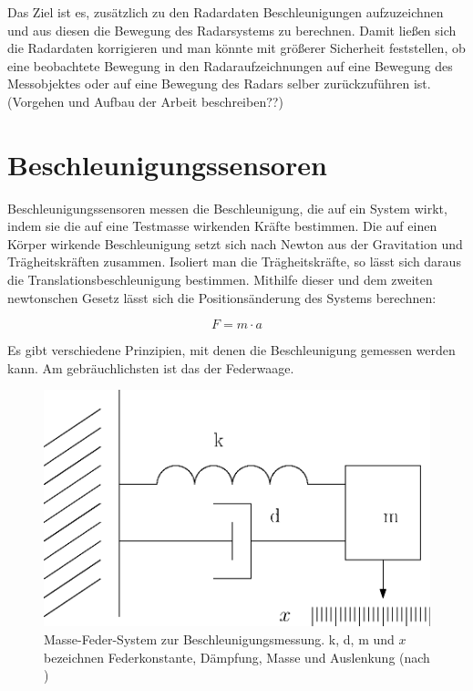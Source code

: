 \documentclass[12pt,a4paper,twoside,BCOR=12.5mm]{scrartcl}
\begin{document}
Das Ziel ist es, zusätzlich zu den Radardaten Beschleunigungen aufzuzeichnen und aus diesen die Bewegung des Radarsystems zu berechnen. Damit ließen sich die Radardaten korrigieren und man könnte mit größerer Sicherheit feststellen, ob eine beobachtete Bewegung in den Radaraufzeichnungen auf eine Bewegung des Messobjektes oder auf eine Bewegung des Radars selber zurückzuführen ist.\\

{\color{red}(Vorgehen und Aufbau der Arbeit beschreiben??)}

\newpage

\section{Beschleunigungssensoren}
\onehalfspacing
Beschleunigungssensoren messen die Beschleunigung, die auf ein System wirkt, indem sie die auf eine Testmasse wirkenden Kräfte bestimmen.  Die auf einen Körper wirkende Beschleunigung setzt sich nach Newton aus der Gravitation und Trägheitskräften zusammen. Isoliert man die Trägheitskräfte, so lässt sich daraus die Translationsbeschleunigung bestimmen. Mithilfe dieser und dem zweiten newtonschen Gesetz lässt sich die Positionsänderung des Systems berechnen: 

\begin{equation}
F = m \cdot a
\end{equation}

Es gibt verschiedene Prinzipien, mit denen die Beschleunigung gemessen werden kann. Am gebräuchlichsten ist das der Federwaage.

\begin{figure}[H]
\centering
\includegraphics[scale=0.7]{federmasse.eps}
\caption{Masse-Feder-System zur Beschleunigungsmessung. k, d, m und $x$ bezeichnen Federkonstante, Dämpfung, Masse und Auslenkung (nach \citep{Klingbeil:2006qy})}
\label{federwaage}
\end{figure}
\end{document}
